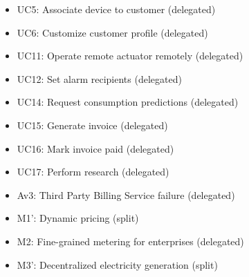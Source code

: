 \begin{itemize}
\begin{itemize}
	  	\item UC5: Associate device to customer (delegated)
	  	\item UC6: Customize customer profile (delegated)
	  	\item UC11: Operate remote actuator remotely (delegated)
	  	\item UC12: Set alarm recipients (delegated)
	  	\item UC14: Request consumption predictions (delegated)
	  	\item UC15: Generate invoice (delegated)
	  	\item UC16: Mark invoice paid (delegated)
	  	\item UC17: Perform research (delegated)
	  	\item Av3: Third Party Billing Service failure (delegated)
	  	\item M1': Dynamic pricing (split)
	  	\item M2: Fine-grained metering for enterprises (delegated)
	  	\item M3': Decentralized electricity generation (split)
	\end{itemize}
\end{itemize}
